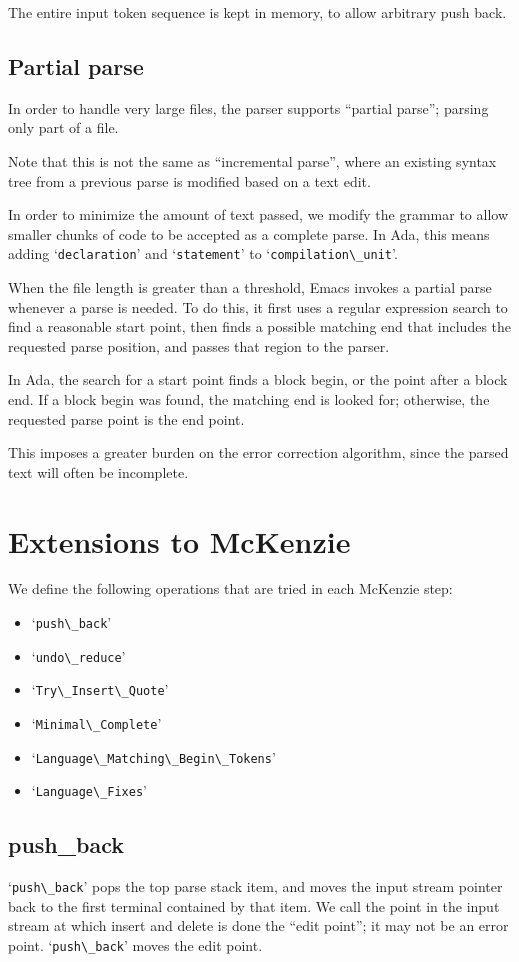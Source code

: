 \documentclass{article}
\newcommand{\code}[1]{`\lstinline|#1|'}
\begin{document}
The entire input token sequence is kept in memory, to allow arbitrary
push back.

\subsection{Partial parse}
In order to handle very large files, the parser supports ``partial
parse''; parsing only part of a file.

Note that this is not the same as ``incremental parse'', where an
existing syntax tree from a previous parse is modified based on a text
edit.

In order to minimize the amount of text passed, we modify the grammar
to allow smaller chunks of code to be accepted as a complete parse. In
Ada, this means adding \code{declaration} and \code{statement} to
\code{compilation\_unit}.

When the file length is greater than a threshold, Emacs invokes a
partial parse whenever a parse is needed. To do this, it first uses a
regular expression search to find a reasonable start point, then finds
a possible matching end that includes the requested parse position, and
passes that region to the parser.

In Ada, the search for a start point finds a block begin, or the point
after a block end. If a block begin was found, the matching end is
looked for; otherwise, the requested parse point is the end point.

This imposes a greater burden on the error correction algorithm, since
the parsed text will often be incomplete.

\section{Extensions to McKenzie}
We define the following operations that are tried in each McKenzie
step:
\begin{itemize}
\item \code{push\_back}
\item \code{undo\_reduce}
\item \code{Try\_Insert\_Quote}
\item \code{Minimal\_Complete}
\item \code{Language\_Matching\_Begin\_Tokens}
\item \code{Language\_Fixes}
\end{itemize}

\subsection{push\_back}
\code{push\_back} pops the top parse stack item, and moves the input
stream pointer back to the first terminal contained by that item. We
call the point in the input stream at which insert and delete is done
the ``edit point''; it may not be an error point. \code{push\_back}
moves the edit point.
\end{document}
